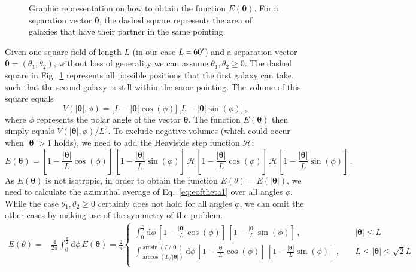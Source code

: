 \documentclass{aa}
\renewcommand{\rm}{\mathrm}
\def\b#1{\bm{#1}}
\def\d{\rm{d}}
\begin{document}
\begin{appendix}
{
\def\vec{\b}
\begin{figure}
    \sidecaption
    \centering
    \def\svgwidth{200pt}    
    \hspace*{1cm}
      
    \hspace*{-2cm}
    \caption{Graphic representation on how to obtain the function $E(\b\theta)$. For a separation vector $\b\theta$, the dashed square represents the area of galaxies that have their partner in the same pointing.}
    \label{fig:explain_etheta}
\end{figure}
}
Given one square field of length $L$ (in our case $L=60^\prime$) and a separation vector $\b\theta = (\theta_1,\theta_2)$, without loss of generality we can assume $\theta_1,\theta_2\geq 0$. The dashed square in Fig.~\ref{fig:explain_etheta} represents all possible positions that the first galaxy can take, such that the second galaxy is still within the same pointing. The volume of this square equals \begin{equation}
V(|\b\theta|,\phi)  = \big[L-|\b\theta|\cos(\phi)\big]\,\big[L-|\b\theta|\sin(\phi)\big]\, ,
\end{equation} where $\phi$ represents the polar angle of the vector $\b\theta$. The function $E(\b\theta)$ then simply equals $V(|\b\theta|,\phi)/L^2$. To exclude negative volumes (which could occur when $|\b\theta|>1$ holds), we need to add the Heaviside step function $\mathcal{H}$:
\begin{equation}
E(\b\theta)  = \left[1-\frac{|\b\theta|}{L}\cos(\phi)\right]\,\left[1-\frac{|\b\theta|}{L}\sin(\phi)\right]\, \mathcal{H}\left[1-\frac{|\b\theta|}{L}\cos(\phi)\right]\,\mathcal{H}\left[1-\frac{|\b\theta|}{L}\sin(\phi)\right]\, .
\label{eq:eoftheta1}
\end{equation} 
As $E(\b\theta)$ is not isotropic, in order to obtain the function $E(\theta) = E(|\b\theta|)$, we need to calculate the azimuthal average of Eq.~\eqref{eq:eoftheta1} over all angles $\phi$. While the case $\theta_1,\theta_2\geq 0$ certainly does not hold for all angles $\phi$, we can omit the other cases by making use of the symmetry of the problem.
\begin{align}
E(\theta) = & \frac{4}{2\pi}\int_0^{\frac{\pi}{2}}\d\phi\, E(\b\theta) = \frac{2}{\pi}\begin{cases}
\int_0^{\frac{\pi}{2}} \d\phi\, \left[1-\frac{|\b\theta|}{L}\cos(\phi)\right]\,\left[1-\frac{|\b\theta|}{L}\sin(\phi)\right]\, ,  & |\b\theta|  \leq L \\[10pt]
\int_{\arccos(L/|\b\theta|)}^{\arcsin(L/|\b\theta|)} \d\phi\, \left[1-\frac{|\b\theta|}{L}\cos(\phi)\right]\,\left[1-\frac{|\b\theta|}{L}\sin(\phi)\right] \, , \quad   & L \leq |\b\theta| \leq \sqrt{2}L \\[10pt]

\end{cases}
\end{align}
\end{appendix}
\end{document}
